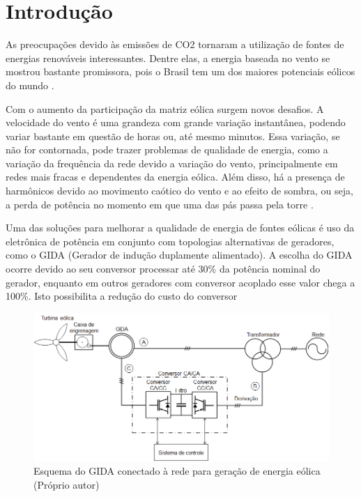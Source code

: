 


\makeindex
\makeglossary




	\chapter{Introdução}
	\setcounter{page}{1}
	
	As preocupações devido às emissões de CO2 tornaram a utilização de fontes de energias renováveis interessantes. Dentre elas, a energia baseada no vento se mostrou bastante promissora, pois o Brasil tem um dos maiores potenciais eólicos do mundo \cite{atlaseolico}.
	
	Com o aumento da participação da matriz eólica surgem novos desafios. A velocidade do vento é uma grandeza com grande variação instantânea, podendo variar bastante em questão de horas ou, até mesmo minutos. Essa variação, se não for contornada, pode trazer problemas de qualidade de energia, como a variação da frequência da rede devido a variação do vento, principalmente em redes mais fracas e dependentes da energia eólica. Além disso, há a presença de harmônicos devido ao movimento caótico do vento e ao efeito de sombra, ou seja, a perda de potência no momento em que uma das pás passa pela torre \cite{pintofundamentos}.
	
	Uma das soluções para melhorar a qualidade de energia de fontes eólicas é uso da eletrônica de potência em conjunto com topologias alternativas de geradores, como o GIDA (Gerador de indução duplamente alimentado).  A escolha do GIDA ocorre devido ao seu conversor processar até 30\% da potência nominal do gerador, enquanto em outros geradores com conversor acoplado esse valor chega a 100\%. Isto possibilita a redução do custo do conversor
	
	\begin{figure}[h]
		\centering
		\includegraphics[width=1\textwidth]{Figuras/gida_esquematico.png}
		\caption{Esquema do GIDA conectado à  rede para geração de energia eólica (Próprio autor)}
		\label{figura:gida_esquematico}
	\end{figure}
	
	
	

